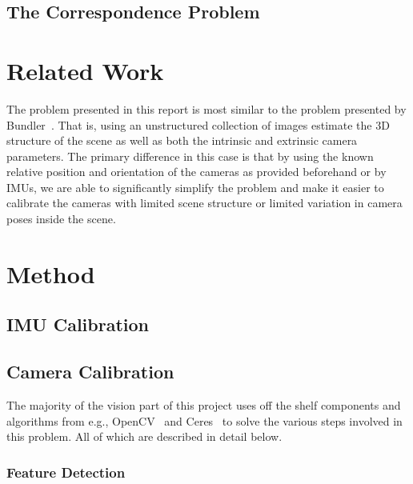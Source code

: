 \documentclass[preprint,acmtog]{acmart}
\begin{document}
\subsection{The Correspondence Problem}



\section{Related Work}


The problem presented in this report is most similar to the problem presented by
Bundler~\cite{bundler2006}. That is, using an unstructured collection of images
estimate the 3D structure of the scene as well as both the intrinsic and
extrinsic camera parameters. The primary difference in this case is that by
using the known relative position and orientation of the cameras as provided
beforehand or by IMUs, we are able to significantly simplify the problem and
make it easier to calibrate the cameras with limited scene structure or limited
variation in camera poses inside the scene.


\section{Method}

\subsection{IMU Calibration}

\subsection{Camera Calibration}

The majority of the vision part of this project uses off the shelf components
and algorithms from e.g., OpenCV~\cite{opencv_library} and
Ceres~\cite{ceres-solver} to solve the various steps involved in this
problem. All of which are described in detail below.

\subsubsection{Feature Detection}
\end{document}
